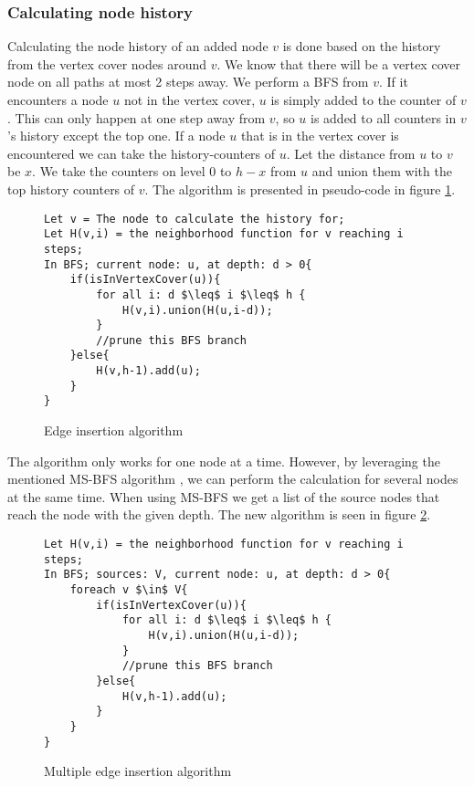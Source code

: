 \subsubsection{Calculating node history}

Calculating the node history of an added node $v$ is done based on the history from the vertex cover nodes around $v$. We know that there will be a vertex cover node on all paths at most 2 steps away. We perform a BFS from $v$. If it encounters a node $u$ not in the vertex cover, $u$ is simply added to the counter of $v$. This can only happen at one step away from $v$, so $u$ is added to all counters in $v$'s history except the top one. If a node $u$ that is in the vertex cover is encountered we can take the history-counters of $u$. Let the distance from $u$ to $v$ be $x$. We take the counters on level $0$ to $h-x$ from $u$ and union them with the top history counters of $v$.   The algorithm is presented in pseudo-code in figure \ref{fig:edge_insertion_algorithm}.

\begin{figure}[h]
    \begin{lstlisting}[mathescape]
Let v = The node to calculate the history for;
Let H(v,i) = the neighborhood function for v reaching i steps;
In BFS; current node: u, at depth: d > 0{
    if(isInVertexCover(u)){
        for all i: d $\leq$ i $\leq$ h {
            H(v,i).union(H(u,i-d));
        }
        //prune this BFS branch
    }else{
        H(v,h-1).add(u);
    }
}
    \end{lstlisting}
    \caption{Edge insertion algorithm}
    \label{fig:edge_insertion_algorithm}
\end{figure}

The algorithm only works for one node at a time. However, by leveraging the mentioned MS-BFS algorithm \cite{msbfs}, we can perform the calculation for several nodes at the same time. When using MS-BFS we get a list of the source nodes that reach the node with the given depth. The new algorithm is seen in figure \ref{fig:multiple_edge_insertion_algorithm}.

\begin{figure}[h]
    \begin{lstlisting}[mathescape]
Let H(v,i) = the neighborhood function for v reaching i steps;
In BFS; sources: V, current node: u, at depth: d > 0{
    foreach v $\in$ V{
        if(isInVertexCover(u)){
            for all i: d $\leq$ i $\leq$ h {
                H(v,i).union(H(u,i-d));
            }
            //prune this BFS branch
        }else{
            H(v,h-1).add(u);
        }
    }
}
    \end{lstlisting}
    \caption{Multiple edge insertion algorithm}
    \label{fig:multiple_edge_insertion_algorithm}
\end{figure}

